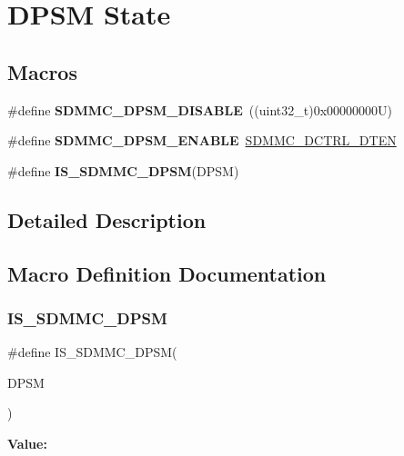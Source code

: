 \hypertarget{group___s_d_m_m_c___l_l___d_p_s_m___state}{}\section{D\+P\+SM State}
\label{group___s_d_m_m_c___l_l___d_p_s_m___state}
\subsection*{Macros}
\begin{DoxyCompactItemize}
\item 
\mbox{\label{group___s_d_m_m_c___l_l___d_p_s_m___state_ga0b34d90e8d89b342360c09f9895059a5}} 
\#define {\bfseries S\+D\+M\+M\+C\+\_\+\+D\+P\+S\+M\+\_\+\+D\+I\+S\+A\+B\+LE}~((uint32\+\_\+t)0x00000000\+U)
\item 
\mbox{\label{group___s_d_m_m_c___l_l___d_p_s_m___state_ga0906a0ce19b3209b0f852963e1e7df15}} 
\#define {\bfseries S\+D\+M\+M\+C\+\_\+\+D\+P\+S\+M\+\_\+\+E\+N\+A\+B\+LE}~\mbox{\hyperlink{group___peripheral___registers___bits___definition_ga90892e49a5447bde575387ef238e6342}{S\+D\+M\+M\+C\+\_\+\+D\+C\+T\+R\+L\+\_\+\+D\+T\+EN}}
\item 
\#define {\bfseries I\+S\+\_\+\+S\+D\+M\+M\+C\+\_\+\+D\+P\+SM}(D\+P\+SM)
\end{DoxyCompactItemize}


\subsection{Detailed Description}


\subsection{Macro Definition Documentation}
\mbox{\label{group___s_d_m_m_c___l_l___d_p_s_m___state_ga7fbda1537c77e188ea0b09818304e4f8}} 
\subsubsection{\texorpdfstring{IS\_SDMMC\_DPSM}{IS\_SDMMC\_DPSM}}
{\footnotesize\ttfamily \#define I\+S\+\_\+\+S\+D\+M\+M\+C\+\_\+\+D\+P\+SM(\begin{DoxyParamCaption}\item[{}]{D\+P\+SM }\end{DoxyParamCaption})}

{\bfseries Value\+:}
\begin{DoxyCode}{0}

\end{DoxyCode}
